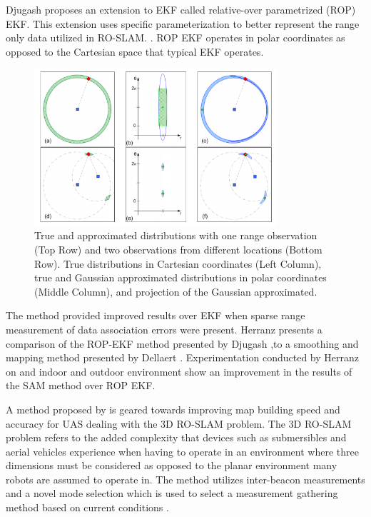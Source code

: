 \documentclass[conference]{IEEEtran}
\begin{document}
Djugash proposes an extension to EKF called relative-over parametrized (ROP) EKF. This extension uses specific parameterization to  better represent the range only data utilized in RO-SLAM. \cite{Djugash2008}. ROP EKF operates in polar coordinates as opposed to the Cartesian space that typical EKF operates.
\begin{figure}[h!]
	\centering
	\includegraphics[width=90mm]{ROP_djugash.png}
	\caption{True and approximated distributions with one range observation (Top Row) and two observations from different locations (Bottom Row). True distributions in	Cartesian coordinates (Left Column), true and Gaussian approximated distributions in polar coordinates (Middle Column), and projection of the Gaussian approximated. \cite{Djugash2008}} %
	\label{ROP_djugash}
\end{figure}


The method provided improved results over EKF when sparse range measurement of data association errors were present. Herranz presents a comparison of the ROP-EKF method presented by Djugash \cite{Djugash2008},to a smoothing and mapping method presented by Dellaert \cite{Dellaert2006}. Experimentation conducted by Herranz on and indoor and outdoor environment show an improvement in the results of the SAM method over ROP EKF. \cite{Herranz2014}

A method proposed by \cite{Dios2015} is geared towards improving map building speed and accuracy for UAS dealing with the 3D RO-SLAM problem. The 3D RO-SLAM problem refers to the added complexity that devices such as submersibles \cite{Newman} and aerial vehicles experience when having to operate in an environment where three dimensions must be considered as opposed to the planar environment many robots are assumed to operate in. The method utilizes inter-beacon measurements and a novel mode selection which is used to select a measurement gathering method based on current conditions \cite{Dios2015}.
\end{document}
